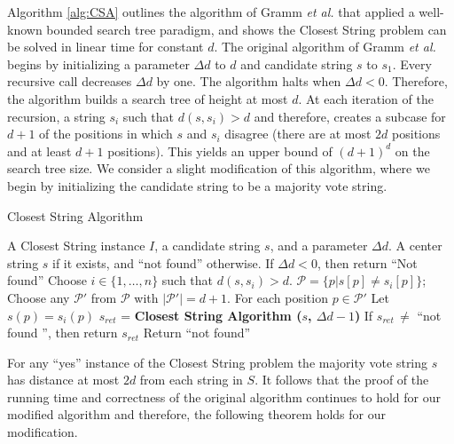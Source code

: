 Algorithm \ref{alg:CSA} outlines the algorithm of Gramm {\em et al.} \cite{GNR03} that applied a well-known bounded search tree paradigm, and shows the {\sc Closest String} problem can be solved in linear time for constant $d$.  The original algorithm of Gramm {\em et al.} \cite{GNR03}  begins by initializing a parameter $\Delta d$ to $d$ and candidate string $s$ to $s_1$.  Every recursive call decreases $\Delta d$ by one.  The algorithm halts when $\Delta d < 0$. Therefore, the algorithm builds a search tree of height at most $d$.  At each iteration of the recursion, a string $s_i$ such that $d(s, s_i) > d$ and therefore, creates a subcase for $d + 1$ of the positions in which $s$ and $s_i$ disagree (there are at most $2d$ positions and at least $d + 1$ positions).  This yields an upper bound of $(d + 1)^d$ on the search tree size.  We consider a slight modification of this algorithm, where we begin by initializing the candidate string to be a majority vote string.

\begin{algorithm}[h]
\caption{Closest String Algorithm}
\begin{algorithmic}
 A {\sc Closest String} instance $I$, a candidate string $s$, and a parameter $\Delta d$.
 A center string $s$ if it exists, and ``not found'' otherwise.
\STATE If $\Delta d < 0$, then return ``Not found''
\STATE Choose $i \in \{1, \ldots, n\}$ such that $d(s, s_i) > d$. 
\STATE \hspace{5mm} $\mathcal{P} = \{p | s[p] \ne s_i[p]\}$;
\STATE \hspace{5mm} Choose any $\mathcal{P}'$ from $\mathcal{P}$ with $|\mathcal{P}'| = d + 1$.
\STATE \hspace{5mm} For each position $p \in \mathcal{P}'$
\STATE \hspace{10mm} Let $s(p) = s_i(p)$ 
\STATE \hspace{10mm} $s_{ret}$ = {\bf Closest String Algorithm ($s$, $\Delta d - 1$)} 
\STATE \hspace{10mm} If $s_{ret} \, \ne$ ``not found '', then return $s_{ret}$
\STATE Return ``not found''
\end{algorithmic}
\label{alg:CSA}
\end{algorithm}

For any ``yes'' instance of the {\sc Closest String} problem the majority vote string $s$ has distance at most $2d$ from each string in $S$. It follows that the proof of the running time and correctness of the original algorithm continues to hold for our modified algorithm and therefore, the following theorem holds for our modification.

